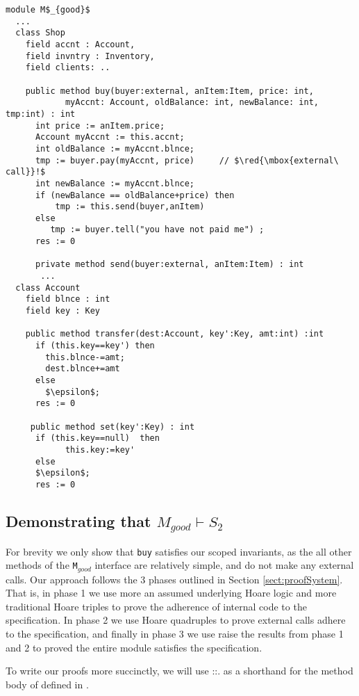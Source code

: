 \begin{lstlisting}[mathescape=true, language=Chainmail, frame=lines]
module M$_{good}$
  ...   
  class Shop
    field accnt : Account, 
    field invntry : Inventory, 
    field clients: ..
  
    public method buy(buyer:external, anItem:Item, price: int, 
            myAccnt: Account, oldBalance: int, newBalance: int, tmp:int) : int
      int price := anItem.price;
      Account myAccnt := this.accnt;
      int oldBalance := myAccnt.blnce;
      tmp := buyer.pay(myAccnt, price)     // $\red{\mbox{external\ call}}!$
      int newBalance := myAccnt.blnce;
      if (newBalance == oldBalance+price) then
          tmp := this.send(buyer,anItem)
      else
         tmp := buyer.tell("you have not paid me") ; 
      res := 0
     
      private method send(buyer:external, anItem:Item) : int
       ... 
  class Account
    field blnce : int 
    field key : Key
    
    public method transfer(dest:Account, key':Key, amt:int) :int
      if (this.key==key') then
        this.blnce-=amt;
        dest.blnce+=amt
      else
        $\epsilon$;
      res := 0
	  
     public method set(key':Key) : int
      if (this.key==null)  then
      		this.key:=key'
      else 
	  $\epsilon$;
      res := 0
\end{lstlisting}

\subsection{Demonstrating that $M_{good} \vdash S_2 $}
 \label{s:app:example:proofs}
 
For brevity we only show that \verb|buy| satisfies our scoped invariants, as the all other methods of 
the \verb|M|$_{good}$ interface are relatively simple, and do not make any external calls. 
Our approach follows the 3 phases outlined in Section \ref{sect:proofSystem}. That is, in
phase 1 we use more an assumed underlying Hoare logic and more traditional Hoare triples to prove the adherence of internal code to
the specification. In phase 2 we use Hoare quadruples to prove external calls adhere
to the specification, and finally in phase 3 we use raise the results from phase 1 and 2 to proved
the entire module satisfies the specification.

{ To write our proofs more succinctly, we will use ::. as a shorthand for the method body of  defined in .}

